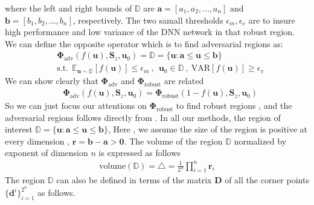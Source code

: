 where the left and right bounds of $\mathbb{D}$ are $\mathbf{a} = [a_{1},a_{2},...,a_{n}]$ and $\mathbf{b} = [b_{1},b_{2},...,b_{n}]$, respectively. The two samall thresholds $\epsilon_{m},\epsilon_{v}$ are to insure high performance and low variance of the DNN network in that robust region. We can define the opposite operator which is to find adversarial regions as:
\begin{equation}
\begin{aligned} 
& \mathbf{\Phi}_{\text{adv}}(f(\mathbf{u}),\mathbf{S}_{z},\mathbf{u}_{0}) = \mathbb{D} = \{\mathbf{u}: \mathbf{a} \leq \mathbf{u} \leq \mathbf{b}\} \\
 & \text{s.t.}~~ \mathbb{E}_{\mathbf{u}\sim \mathbb{D}} [f(\mathbf{u})] \leq \epsilon_{m}~, ~~ \mathbf{u}_{0} \in \mathbb{D} ~, ~ \text{VAR}[f(\mathbf{u})] \ge \epsilon_{v}
\label{eq:phi-adv}
\end{aligned}
\end{equation}
We can show clearly that $\mathbf{\Phi}_{\text{adv}}$ and $\mathbf{\Phi}_{\text{robust}}$ are related
\begin{equation}
\begin{aligned} 
& \mathbf{\Phi}_{\text{adv}}(f(\mathbf{u}),\mathbf{S}_{z},\mathbf{u}_{0}) = \mathbf{\Phi}_{\text{robust}}(1-f(\mathbf{u}),\mathbf{S}_{z},\mathbf{u}_{0})
\label{eq:phi-adv-robust}
\end{aligned}
\end{equation}
So we can just focus our attentions on $\mathbf{\Phi}_{\text{robust}}$ to find robust regions , and the adversarial regions follows directly from \eqLabel{\ref{eq:phi-adv-robust}}. In all our methods, the region of interest $\mathbb{D} = \{\mathbf{u}: \mathbf{a} \leq \mathbf{u} \leq \mathbf{b}\}$, Here , we assume the size of the region is positive at every dimension , \ie $\mathbf{r} =  \mathbf{b} -  \mathbf{a} > \mathbf{0} $. The volume of the region $\mathbb{D}$ normalized by exponent of dimension $n$ is expressed as follows %
\begin{equation}
\begin{aligned} 
\text{volume}(\mathbb{D}) = \triangle = \frac{1}{2^{n}}\prod_{i=1}^{n}\mathbf{r}_{i} 
\label{eq:n-vol}
\end{aligned}
\end{equation}
The region $\mathbb{D}$ can also be defined in terms of the matrix $\mathbf{D}$ of all the corner points $\{\mathbf{d}^{i}\}_{i=1}^{2^{n}}$ as follows.

